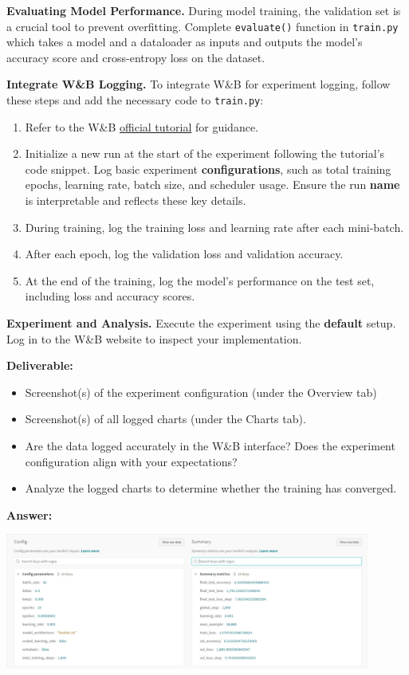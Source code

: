 \documentclass[11pt, oneside]{article}   	%
\begin{document}
\noindent \textbf{Evaluating Model Performance.}
During model training, the validation set is a crucial tool to prevent overfitting. Complete \texttt{evaluate()} function in \texttt{train.py} which takes a model and a dataloader as inputs and outputs the model's accuracy score and cross-entropy loss on the dataset. 

\noindent \textbf{Integrate W\&B Logging.}
To integrate W\&B for experiment logging, follow these steps and add the necessary code to \texttt{train.py}:
\begin{enumerate}
    \item Refer to the W\&B \href{https://docs.wandb.ai/tutorials/experiments}{official tutorial} for guidance.
    \item Initialize a new run at the start of the experiment following the tutorial's code snippet. Log basic experiment \textbf{configurations}, such as total training epochs, learning rate, batch size, and scheduler usage. Ensure the run \textbf{name} is interpretable and reflects these key details.
    \item During training, log the training loss and learning rate after each mini-batch.
    \item After each epoch, log the validation loss and validation accuracy.
    \item At the end of the training, log the model's performance on the test set, including loss and accuracy scores.
\end{enumerate}

\noindent \textbf{Experiment and Analysis. }
Execute the experiment using the \textbf{default} setup. Log in to the W\&B website to inspect your implementation. 

\noindent\textbf{Deliverable:}
\begin{itemize}
    \item Screenshot(s) of the experiment configuration (under the Overview tab)
    \item Screenshot(s) of all logged charts (under the Charts tab).
    \item Are the data logged accurately in the W\&B interface? Does the experiment configuration align with your expectations?
    \item Analyze the logged charts to determine whether the training has converged.
\end{itemize}


\textbf{Answer:} \\
\begin{center}
    \includegraphics[width=0.9\textwidth]{report_pic/Experiment_Config.png}
\end{center}
\end{document}
